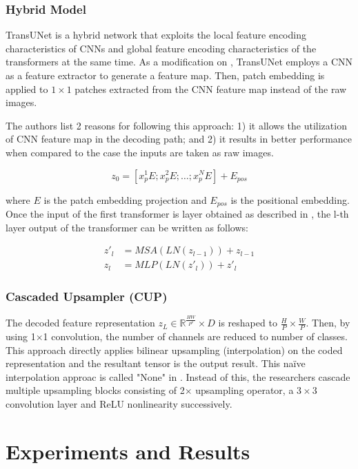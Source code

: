 \documentclass{IEEEtran}
\begin{document}
\subsubsection{Hybrid Model}
TransUNet is a hybrid network that exploits the local feature encoding characteristics of CNNs and global feature encoding characteristics of the transformers at the same time. As a modification on \cite{dosovitskiy2020image}, TransUNet employs a CNN as a feature extractor to generate a feature map. Then, patch embedding is applied to $1 \times 1$ patches extracted from the CNN feature map instead of the raw images. 

The authors list 2 reasons for following this approach: 1) it allows the utilization of CNN feature map in the decoding path; and 2) it results in better performance when compared to the case the inputs are taken as raw images. 

\begin{equation}
    z_0 = [x_p^1E; x_p^2E; \hdots; x_p^NE] + E_{pos}
    \label{eq:firstinput}
\end{equation}

where $E$ is the patch embedding projection and $E_{pos}$ is the positional embedding. 
Once the input of the first transformer is layer obtained as described in , the l-th layer output of the transformer can be written as follows: 

\begin{eqnarray}
    {z'}_l &= MSA(LN(z_{l-1})) + z_{l-1} \\
    z_l &= MLP(LN({z'}_l)) + {z'}_l
\end{eqnarray}
\vfill\null\newpage
\subsubsection{Cascaded Upsampler (CUP)}
The decoded feature representation $z_L \in \mathbb{R}^{\frac{HW}{P^2}} \times D$ is reshaped to $\frac{H}{P} \times \frac{W}{P}$. Then, by using 1$\times$1 convolution, the number of channels are reduced to number of classes. This approach directly applies bilinear upsampling (interpolation) on the coded representation and the resultant tensor is the output result. This na\"ive interpolation approac is called "None" in \cite{chen2021transunet}. Instead of this, the researchers cascade multiple upsampling blocks consisting of 2$\times$ upsampling operator, a $3\times 3$ convolution layer and ReLU nonlinearity successively. 

\section{Experiments and Results}
\end{document}
